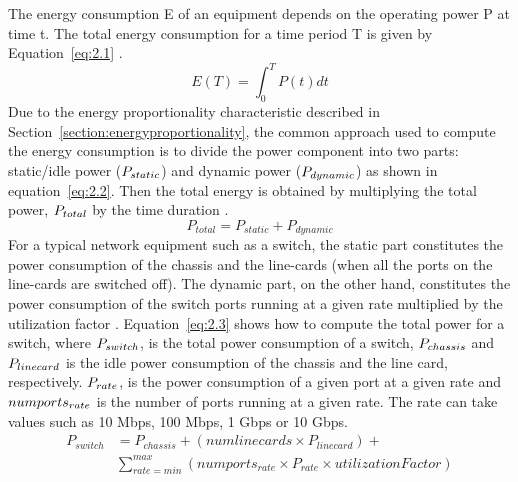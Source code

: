 The energy consumption E of an equipment depends on the operating power P at time t. The total energy consumption for a time period T is given by Equation~\ref{eq:2.1} \cite{DBLP:conf/wowmom/OrgerieLLL11}. 
\begin{equation} \label{eq:2.1}
  E(T) = \int_{0}^{T} P(t) dt
\end{equation} 
Due to the energy proportionality characteristic described in Section~\ref{section:energyproportionality}, the common approach used to compute the energy consumption is to divide the power component into two parts: static/idle power (\($$P_{static}$$\)) and dynamic power (\($$P_{dynamic}$$\)) as shown in equation~\ref{eq:2.2}. Then the total energy is obtained by multiplying the total power, \($$P_{total}$$\) by the time duration \cite{DBLP:conf/wowmom/OrgerieLLL11,DBLP:journals/tjs/KliazovichBK12,DBLP:conf/networking/MahadevanSBR09,DBLP:journals/comsur/DayarathnaWF16}. 
\begin{equation} \label{eq:2.2}
 P_{total} = P_{static} + P_{dynamic}
\end{equation} 
For a typical network equipment such as a switch, the static part constitutes the power consumption of the chassis and the line-cards (when all the ports on the line-cards are switched off). The dynamic part, on the other hand, constitutes the power consumption of the switch ports running at a given rate multiplied by the utilization factor \cite{DBLP:conf/networking/MahadevanSBR09}. Equation~\ref{eq:2.3} shows how to compute the total power for a switch, where \($$P_{switch}$$\), is the total power consumption of a switch, \($$P_{chassis}$$\) and \($$P_{linecard}$$\) is the idle power consumption of the chassis and the line card, respectively. \($$P_{rate}$$\), is the power consumption of a given port at a given rate and \($$numports_{rate}$$\) is the number of ports running at a given rate. The rate can take values such as 10 Mbps, 100 Mbps, 1 Gbps or 10 Gbps.
\begin{equation} \label{eq:2.3}
\begin{split}
P_{switch} &= P_{chassis} + (numlinecards \times P_{linecard})  + \\
&\sum_{rate=min}^{max} (numports_{rate} \times P_{rate} \times utilizationFactor)
\end{split}
\end{equation}
